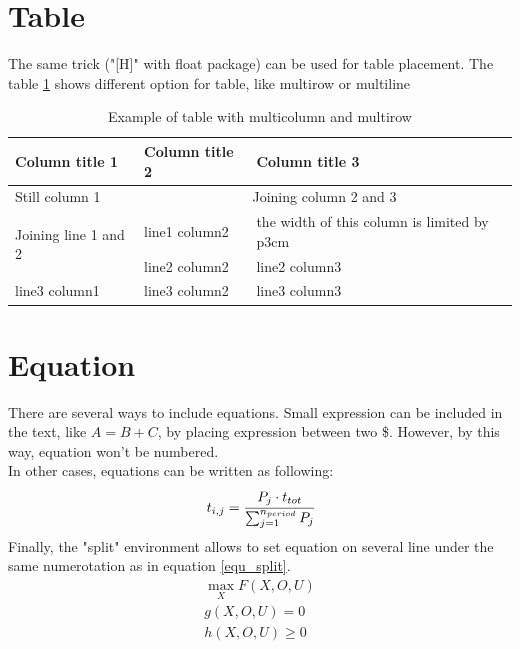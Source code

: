 \documentclass[a4paper,12pt]{article}
\begin{document}
\section{Table}
The same trick ("[H]" with float package) can be used for table placement. The table \ref{table_example} shows different option for table, like multirow or multiline
\begin{table}[H]
\begin{center}
\begin{tabular}{|l|l|p{3cm}|}
\hline
Column title 1 & Column title 2 & Column title 3\\
\hline
\hline
 Still column 1 & \multicolumn{2}{c|}{Joining column 2 and 3}\\
\hline
 \multirow{2}{*}{Joining line 1 and 2}
            & line1 column2 & the width of this column is limited by p{3cm}\\
            & line2 column2 & line2 column3\\
\hline
line3 column1 & line3 column2 & line3 column3 \\
\hline
\end{tabular}
\caption{Example of table with multicolumn and multirow}
\label{table_example}
\end{center}
\end{table}

\section{Equation}
There are several ways to include equations. Small expression can be included in the text, like $A=B+C$, by placing expression between two \$. However, by this way, equation won't be numbered.\\
In other cases, equations can be written as following:
\begin{equation}
 t_{i,j}=\cfrac{P_j\cdot t_{tot}}{\sum_{j=1}^{n_{period}}P_j}
\end{equation}
Finally, the "split" environment allows to set equation on several line under the same numerotation as in equation \ref{equ_split}.
\begin{equation}
 \begin{split}
  \max_X F(X,O,U)\\
g(X,O,U) = 0\\
h(X,O,U) \geqslant 0
 \end{split}
\label{equ_split}
\end{equation}
\end{document}
